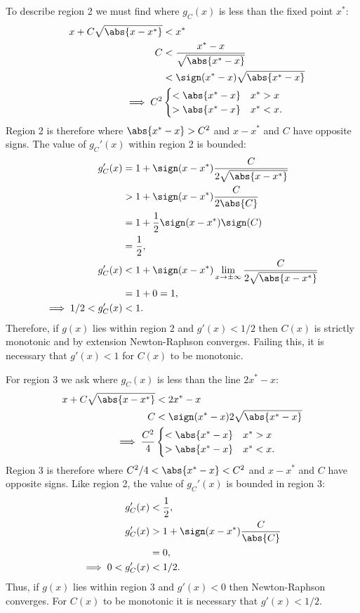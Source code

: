 \documentclass{article}
\begin{document}
To describe region 2 we must find where $g_C(x)$ is less than the fixed point $x^*$:
\begin{align*}
&& x + C \sqrt{\abs{x - x^*}} & < x^* \\
&&                          C & < \frac{x^* - x}{\sqrt{\abs{x^*-x}}} \\
&&                            & < \sign(x^*-x) \sqrt{\abs{x^*-x}} \\
&&  			 \implies C^2 & \begin{cases} < \abs{x^*-x} & x^* > x \\ > \abs{x^*-x} & x^* < x . \end{cases}
\end{align*}
Region 2 is therefore where $\abs{x^*-x} > C^2$ and $x-x^*$ and $C$ have opposite signs.
The value of $g_C'(x)$ within region 2 is bounded:
\begin{align*}
g_C'(x) & = 1 + \sign(x-x^*) \frac{C}{2 \sqrt{\abs{x-x^*}}} \\
		& > 1 + \sign(x-x^*) \frac{C}{2 \abs{C}} \\
		& = 1 + \frac{1}{2} \sign(x-x^*) \sign(C) \\
		& = \frac{1}{2} , \\
g_C'(x) & < 1 + \sign(x-x^*) \lim_{x \rightarrow \pm \infty} \frac{C}{2 \sqrt{\abs{x-x^*}}} \\
		& = 1 + 0 = 1 , \\
\implies 1/2 < g_C'(x) & < 1 .
\end{align*}
Therefore, if $g(x)$ lies within region 2 and $g'(x) < 1/2$ then $C(x)$ is strictly monotonic and by extension Newton-Raphson converges.
Failing this, it is necessary that $g'(x) < 1$ for $C(x)$ to be monotonic.

For region 3 we ask where $g_C(x)$ is less than the line $2 x^* - x$:
\begin{align*}
x + C \sqrt{\abs{x-x^*}} & < 2 x^* - x \\
					C 	 & < \sign(x^*-x) 2 \sqrt{\abs{x^*-x}} \\
  \implies \frac{C^2}{4} & \begin{cases} < \abs{x^*-x} & x^* > x \\ > \abs{x^*-x} & x^* < x . \end{cases}
\end{align*}
Region 3 is therefore where $C^2/4 < \abs{x^*-x} < C^2$ and $x-x^*$ and $C$ have opposite signs.
Like region 2, the value of $g_C'(x)$ is bounded in region 3:
\begin{align*}
g_C'(x) & < \frac{1}{2} ,\\
g_C'(x) & > 1 + \sign(x-x^*) \frac{C}{\abs{C}} \\
		& = 0 , \\
\implies 0 < g_C'(x) & < 1/2 .
\end{align*}
Thus, if $g(x)$ lies within region 3 and $g'(x) < 0$ then Newton-Raphson converges.
For $C(x)$ to be monotonic it is necessary that $g'(x) < 1/2$.
\end{document}
